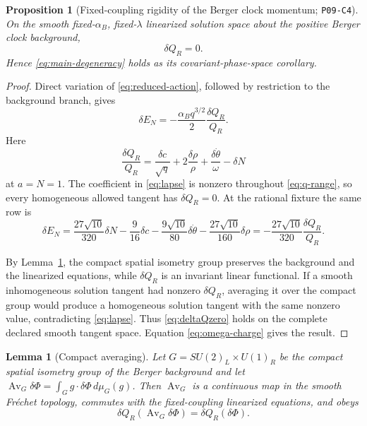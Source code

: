\documentclass[11pt]{article}
\newtheorem{proposition}[theorem]{Proposition}
\newtheorem{lemma}[theorem]{Lemma}
\theoremstyle{definition}
\theoremstyle{remark}
\newcommand{\claimid}[1]{\texttt{#1}}
\begin{document}
\begin{proposition}[Fixed-coupling rigidity of the Berger clock momentum;
\claimid{P09-C4}]\label{prop:charge}
On the smooth fixed-$\alpha_B$, fixed-$\lambda$ linearized solution space
about the positive Berger clock background,
\begin{equation}\label{eq:deltaQzero}
 \delta Q_R=0.
\end{equation}
Hence \eqref{eq:main-degeneracy} holds as its covariant-phase-space
corollary.
\end{proposition}

\begin{proof}
Direct variation of \eqref{eq:reduced-action}, followed by restriction to the
background branch, gives
\begin{equation}\label{eq:lapse}
 \delta E_N=-\frac{\alpha_Bq^{3/2}}2\frac{\delta Q_R}{Q_R}.
\end{equation}
Here
\begin{equation}\label{eq:relative-Q}
 \frac{\delta Q_R}{Q_R}
 =\frac{\delta c}{\sqrt q}+2\frac{\delta\rho}{\rho}
 +\frac{\delta\dot\theta}{\omega}-\delta N
\end{equation}
at $a=N=1$.  The coefficient in \eqref{eq:lapse} is nonzero throughout
\eqref{eq:q-range}, so every homogeneous allowed tangent has
$\delta Q_R=0$.  At the rational fixture the same row is
\begin{equation}
 \delta E_N=\frac{27\sqrt{10}}{320}\delta N
 -\frac9{16}\delta c-\frac{9\sqrt{10}}{80}\delta\dot\theta
 -\frac{27\sqrt{10}}{160}\delta\rho
 =-\frac{27\sqrt{10}}{320}\frac{\delta Q_R}{Q_R}.
\end{equation}

By Lemma~\ref{lem:averaging}, the compact spatial isometry group preserves the
background and the
linearized equations, while $\delta Q_R$ is an invariant linear functional.
If a smooth inhomogeneous solution tangent had nonzero $\delta Q_R$, averaging
it over the compact group would produce a homogeneous solution tangent with
the same nonzero value, contradicting \eqref{eq:lapse}.  Thus
\eqref{eq:deltaQzero} holds on the complete declared smooth tangent space.
Equation \eqref{eq:omega-charge} gives the result.
\end{proof}

\begin{lemma}[Compact averaging]\label{lem:averaging}
Let $G=SU(2)_L\times U(1)_R$ be the compact spatial isometry group of the
Berger background and let
$\operatorname{Av}_G\delta\Phi=\int_Gg\cdot\delta\Phi\,d\mu_G(g)$.
Then $\operatorname{Av}_G$ is a continuous map in the smooth Fr\'echet
topology, commutes with the fixed-coupling linearized equations, and obeys
\begin{equation}
 \delta Q_R(\operatorname{Av}_G\delta\Phi)
 =\delta Q_R(\delta\Phi).
\end{equation}
\end{lemma}
\end{document}
